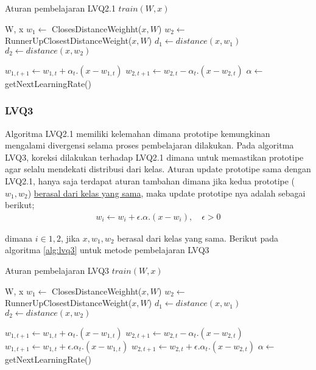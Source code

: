 \begin{algorithm}  
\caption{Aturan pembelajaran LVQ2.1 $train(W, x)$}          
\label{alg:lvq21}                           
\begin{algorithmic}                    %
	\REQUIRE W, x
	\STATE $w_1 \leftarrow $ ClosesDistanceWeighht($x, W$)
	\STATE $w_2 \leftarrow $ RunnerUpClosestDistanceWeight($x, W$)
	\STATE $d_1 \leftarrow distance(x, w_1)$
	\STATE $d_2 \leftarrow distance(x, w_2)$
	
			\STATE $w_{1,t+1} \leftarrow w_{1,t} + \alpha_t . (x - w_{1,t})$
			\STATE $w_{2,t+1} \leftarrow w_{2,t} - \alpha_t . (x - w_{2,t})$
		\ENDIF
	\ENDIF
	\STATE $\alpha \leftarrow $ getNextLearningRate()
\end{algorithmic}
\end{algorithm}

\subsubsection{LVQ3}
Algoritma LVQ2.1 memiliki kelemahan dimana prototipe kemungkinan mengalami
divergensi selama proses pembelajaran dilakukan\cite{Sato:1998}. Pada algoritma
LVQ3, koreksi dilakukan terhadap LVQ2.1 dimana untuk memastikan prototipe agar
selalu mendekati distribusi dari kelas. Aturan update prototipe sama dengan
LVQ2.1, hanya saja terdapat aturan tambahan dimana jika kedua prototipe ($w_1,
w_2$) \underline{berasal dari kelas yang sama}, maka update prototipe nya adalah
sebagai berikut;
\begin{align}
w_i \leftarrow w_i + \epsilon . \alpha . (x - w_i), \quad \epsilon > 0
\end{align}

\noindent
dimana $i \in {1,2}$, jika $x, w_1, w_2$ berasal dari kelas yang sama.
Berikut pada algoritma \ref{alg:lvq3} untuk metode pembelajaran LVQ3

\begin{algorithm}  
\caption{Aturan pembelajaran LVQ3 $train(W, x)$}          
\label{alg:lvq3}                           
\begin{algorithmic}                    %
	\REQUIRE W, x
	\STATE $w_1 \leftarrow $ ClosesDistanceWeighht($x, W$)
	\STATE $w_2 \leftarrow $ RunnerUpClosestDistanceWeight($x, W$)
	\STATE $d_1 \leftarrow distance(x, w_1)$
	\STATE $d_2 \leftarrow distance(x, w_2)$
	
			\STATE $w_{1,t+1} \leftarrow w_{1,t} + \alpha_t . (x - w_{1,t})$
			\STATE $w_{2,t+1} \leftarrow w_{2,t} - \alpha_t . (x - w_{2,t})$
		\ENDIF
	\ELSE
		\STATE $w_{1,t+1} \leftarrow w_{1,t} + \epsilon.\alpha_t . (x - w_{1,t})$
		\STATE $w_{2,t+1} \leftarrow w_{2,t} + \epsilon.\alpha_t . (x - w_{2,t})$
	\ENDIF
	\STATE $\alpha \leftarrow $ getNextLearningRate()
\end{algorithmic}
\end{algorithm}  

